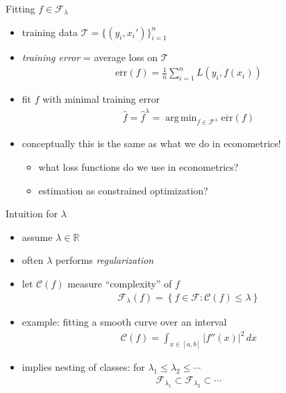 \documentclass[xcolor=dvipsnames, handout]{beamer}
\DeclareMathOperator{\argmin}{arg\,min}
\begin{document}
\begin{frame}{Fitting $f \in \mathcal{F}_{\lambda}$}
\begin{itemize}
  \item training data $\mathcal{T} = \{ (y_i, x_i') \}_{i=1}^n$
  \item \emph{training error} = average loss on $\mathcal{T}$
  \begin{align*}
     \overline{\text{err}} (f) = \frac{1}{n} \sum_{i=1}^n L\left(y_i, f(x_i) \right) 
   \end{align*} 
   \item fit $f$ with minimal training error
   \begin{align*}
     \hat{f} = \hat{f}^{\lambda} = \argmin_{f \in \mathcal{F}^{\lambda}} \overline{\text{err}} (f) 
   \end{align*}
   \item conceptually this is the same as what we do in econometrics! 
   \begin{itemize}
     \item what loss functions do we use in econometrics?
     \item estimation as constrained optimization?
   \end{itemize}
\end{itemize}
\end{frame}


\begin{frame}{Intuition for $\lambda$}
\begin{itemize}
  \item assume $\lambda \in \mathbb{R}$
  \item often $\lambda$ performs \emph{regularization}
  \item let $\mathcal{C}(f)$ measure ``complexity'' of $f$
  \begin{align*}
    \mathcal{F}_{\lambda}(f) = \left\{f \in \mathcal{F} : \mathcal{C}(f) \leq \lambda \right\}   
  \end{align*} 
  \item example: fitting a smooth curve over an interval
  \begin{align*}
    \mathcal{C}(f) = \int_{x \in [a,b]} \lvert f''(x) \rvert^2 \, dx
  \end{align*}
  \item implies nesting of classes: for $\lambda_1 \leq \lambda_2 \leq \dotsb$
  \begin{align*}
    \mathcal{F}_{\lambda_1}\subset \mathcal{F}_{\lambda_2} \subset \dotsb
  \end{align*}
\end{itemize}
\end{frame}
\end{document}

